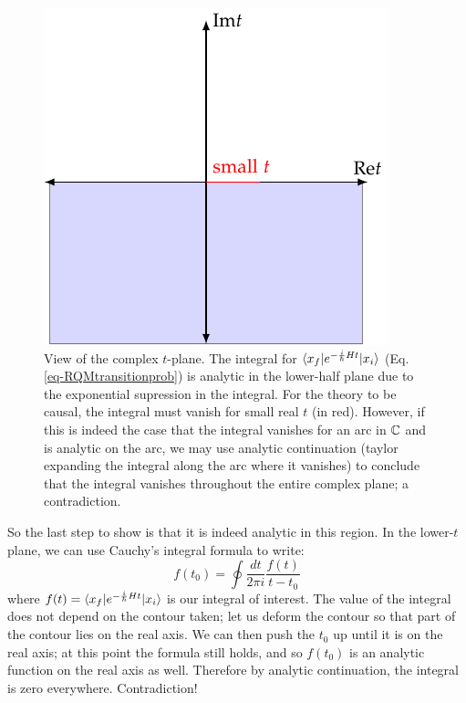\begin{figure}[htbp]
    \centering
    \includegraphics[]{Images/fig-smalltanalyticity.pdf}

    \caption{View of the complex $t$-plane. The integral for $\langle x_f \rvert e^{-\frac{i}{\hbar}Ht}\lvert x_i \rangle$ (Eq. \eqref{eq-RQMtransitionprob}) is analytic in the lower-half plane due to the exponential supression in the integral. For the theory to be causal, the integral must vanish for small real $t$ (in red). However, if this is indeed the case that the integral vanishes for an arc in $\mathbb{C}$ and is analytic on the arc, we may use analytic continuation (taylor expanding the integral along the arc where it vanishes) to conclude that the integral vanishes throughout the entire complex plane; a contradiction.}
    \label{fig-smalltanalyticity}
\end{figure}


So the last step to show is that it is indeed analytic in this region. In the lower-$t$ plane, we can use Cauchy's integral formula to write:
\begin{equation}
    f(t_0) = \oint \frac{dt}{2\pi i}\frac{f(t)}{t - t_0}
\end{equation}
where $f(t) = \langle x_f \rvert e^{-\frac{i}{\hbar}Ht}\lvert x_i \rangle$ is our integral of interest. The value of the integral does not depend on the contour taken; let us deform the contour so that part of the contour lies on the real axis. We can then push the $t_0$ up until it is on the real axis; at this point the formula still holds, and so $f(t_0)$ is an analytic function on the real axis as well. Therefore by analytic continuation, the integral is zero everywhere. Contradiction!

